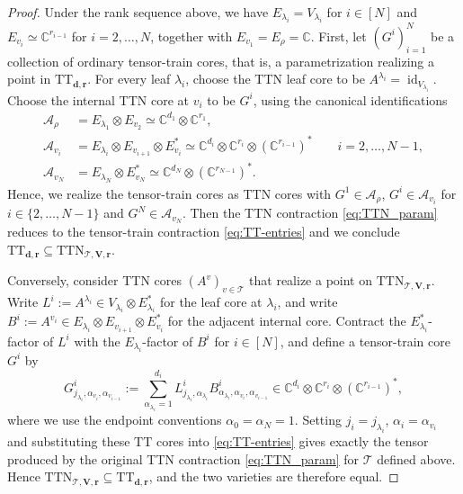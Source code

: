 \documentclass[12pt]{article}
\theoremstyle{definition}
\numberwithin{theorem}{section}
\newcommand{\CC}{\mathbb{C}}
\begin{document}
\begin{proof}
Under the rank sequence above, we have $E_{\lambda_i}=V_{\lambda_i}$ for $i \in [N]$ and $E_{v_i}\simeq\mathbb C^{r_{i-1}}$ for $i=2,\ldots,N$, together with $E_{v_1}=E_\rho=\mathbb C$.
First, let $(G^i)_{i=1}^N$ be a collection of ordinary tensor-train
cores, that is, a parametrization realizing a point in $\mathrm{TT}_{\mathbf{d}, \mathbf{r}}$. For every leaf $\lambda_i$, choose the TTN leaf core to be $A^{\lambda_i}
=
\operatorname{id}_{V_{\lambda_i}}.$
Choose the internal TTN core at $v_i$ to be $G^i$, using the
canonical identifications
$$
\begin{aligned}
\mathcal A_\rho
&=
E_{\lambda_1}\otimes E_{v_2}
\simeq
\CC^{d_1}\otimes\mathbb C^{r_1},\\
\mathcal A_{v_i}
&=
E_{\lambda_i}\otimes E_{v_{i+1}}\otimes E_{v_i}^*
\simeq
\CC^{d_i}
\otimes
\mathbb C^{r_i}
\otimes
(\mathbb C^{r_{i-1}})^* \quad \quad i=2,\ldots, N-1,\\
\mathcal A_{v_N}
&=
E_{\lambda_N}\otimes E_{v_N}^*
\simeq
\CC^{d_N}\otimes(\mathbb C^{r_{N-1}})^*.
\end{aligned}
$$
Hence, we realize the tensor-train cores as TTN cores with $G^1 \in \mathcal A_\rho$, $G^i \in \mathcal A_{v_i}$ for $i \in \{2,\ldots, N-1\}$ and $G^N \in \mathcal A_{v_N}$.
Then the TTN contraction \eqref{eq:TTN_param} reduces to the
tensor-train contraction \eqref{eq:TT-entries} and we conclude 
$
\mathrm{TT}_{\mathbf d,\mathbf r}
\subseteq
\mathrm{TTN}_{\mathscr T,\mathbf V,\mathbf r}$.

Conversely, consider TTN cores $(A^v)_{v\in\mathscr{T}}$ that realize a point on $\mathrm{TTN}_{\mathscr T,\mathbf V,\mathbf r}$. Write
$
L^i:=A^{\lambda_i}
\in
V_{\lambda_i}\otimes E_{\lambda_i}^*$
for the leaf core at $\lambda_i$, and write 
$ B^i:=A^{v_i} \in E_{\lambda_i}\otimes E_{v_{i+1}}\otimes E_{v_i}^*
$
for the adjacent internal core. Contract the
$E_{\lambda_i}^*$-factor of $L^i$ with the
$E_{\lambda_i}$-factor of $B^i$ for $i \in [N]$, and define a 
tensor-train core $G^i$ by
\[
G^i_{j_{\lambda_i},\alpha_{v_i},\alpha_{v_{i-1}}}
:=
\sum_{\alpha_{\lambda_i}=1}^{d_i}
L^i_{j_{\lambda_i},\alpha_{\lambda_i}}
B^i_{\alpha_{\lambda_i},\alpha_{v_i},\alpha_{v_{i-1}}} \in
\CC^{d_i}
\otimes
\mathbb C^{r_i}
\otimes
(\mathbb C^{r_{i-1}})^*,
\]
where we use the endpoint conventions $\alpha_0=\alpha_N=1.$
Setting $j_i = j_{\lambda_i}$, $\alpha_i = \alpha_{v_i}$ and substituting these $\mathrm{TT}$ cores into
\eqref{eq:TT-entries} gives exactly the tensor produced by the
original TTN contraction \eqref{eq:TTN_param} for $\mathscr{T}$ defined above. Hence
$
\mathrm{TTN}_{\mathscr T,\mathbf V,\mathbf r}
\subseteq
\mathrm{TT}_{\mathbf d,\mathbf r}$, and
the two varieties are therefore equal.
\end{proof}
\end{document}
